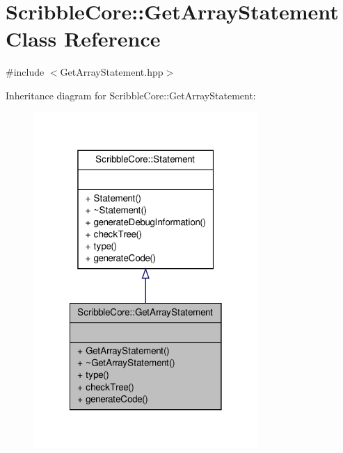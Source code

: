 \hypertarget{class_scribble_core_1_1_get_array_statement}{\section{Scribble\-Core\-:\-:Get\-Array\-Statement Class Reference}
\label{class_scribble_core_1_1_get_array_statement}
}


{\ttfamily \#include $<$Get\-Array\-Statement.\-hpp$>$}



Inheritance diagram for Scribble\-Core\-:\-:Get\-Array\-Statement\-:
\nopagebreak
\begin{figure}[H]
\begin{center}
\leavevmode
\includegraphics[width=242pt]{class_scribble_core_1_1_get_array_statement__inherit__graph}
\end{center}
\end{figure}


